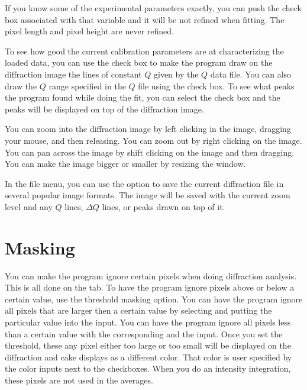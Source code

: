 If you know some of the experimental parameters exactly, you
can push the  check box associated with that
variable and it will be not refined when fitting. The pixel 
length and pixel height are never refined.

To see how good the current calibration parameters are at
characterizing the loaded data, you can use the 
 check box to make the program draw
on the diffraction image the lines of constant $Q$ given
by the $Q$ data file. You can also draw the $Q$ range 
specified in the $Q$ file using the  
check box. To see what peaks the program found while doing the 
fit, you can select the  check box and the
peaks will be displayed on top of the diffraction image.

You can zoom into the diffraction image by left clicking
in the image, dragging your mouse, and then releasing.
You can zoom out by right clicking on the image. You can
pan across the image by shift clicking on the image and 
then dragging. You can make the image bigger or smaller 
by resizing the window.

In the file menu, you can use the  option
to save the current diffraction file in several popular
image formats. The image will be saved with the current
zoom level and any $Q$ lines, $\Delta Q$ lines, or peaks
drawn on top of it.

\section{Masking}
You can make the program ignore certain pixels when doing
diffraction analysis. This is all done on the 
tab. To have the program ignore pixels above or below a 
certain value, use the threshold masking option.
You can have the program ignore all pixels that are larger 
then a certain value by selecting 
 and putting the particular value
into the  input.
You can have the program ignore all pixels less than a certain
value with the corresponding 
and the  input.
Once you set the threshold, these any pixel either too large
or too small will be displayed on the diffraction and cake
displays as a different color. That color is user 
specified by the color inputs next to the checkboxes. 
When you do an intensity integration, these pixels are 
not used in the averages.

